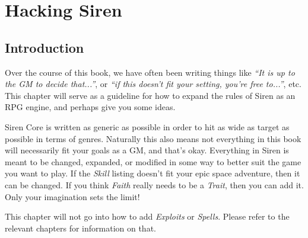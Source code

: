 \chapter{Hacking Siren}
\section{Introduction}
Over the course of this book, we have often been writing things like \textit{``It is up to the GM to decide that...''}, or \textit{``if this doesn't fit your setting, you're free to...''}, etc.
This chapter will serve as a guideline for how to expand the rules of Siren as an RPG engine, and perhaps give you some ideas.

Siren Core is written as generic as possible in order to hit as wide as target as possible in terms of genres.
Naturally this also means not everything in this book will necessarily fit your goals as a GM, and that's okay.
Everything in Siren is meant to be changed, expanded, or modified in some way to better suit the game you want to play.
If the \textit{Skill} listing doesn't fit your epic space adventure, then it can be changed.
If you think \textit{Faith} really needs to be a \textit{Trait}, then you can add it.
Only your imagination sets the limit!

\begin{note}
    This chapter will not go into how to add \textit{Exploits} or \textit{Spells}.
    Please refer to the relevant chapters for information on that.
\end{note}




